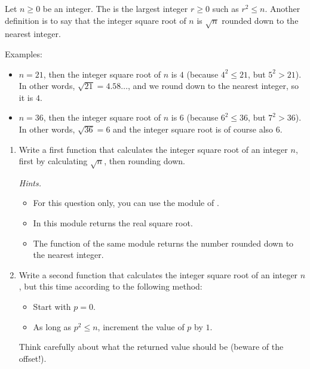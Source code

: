 \documentclass[11pt,class=report,crop=false]{standalone}
\begin{document}

\begin{activite}



Let $n \ge 0$ be an integer. 
The  is the largest integer $r\ge0$ such as $r^2 \le  n$. 
Another definition is to say that the integer square root of $n$ is $\sqrt{n}$ rounded down to the nearest integer.

Examples:
\begin{itemize}
  \item $n=21$, then the integer square root of $n$ is $4$ (because $4^2 \le 21$, but $5^2 > 21$). In other words, $\sqrt{21} = 4.58\ldots$, and we round down to the nearest integer, so it is $4$.
  
  \item $n=36$, then the integer square root of $n$ is $6$ (because $6^2 \le 36$, but $7^2 > 36$). In other words, $\sqrt{36} = 6$ and the integer square root is of course also $6$.    
\end{itemize}

\begin{enumerate}
  \item Write a first function that calculates the integer square root of an integer $n$, first by calculating $\sqrt{n}$, then rounding down.
  
  \emph{Hints.}
  \begin{itemize}
    \item For this question only, you can use the  module of \Python. 
    \item In this module  returns the real square root.
    \item The function  of the same module returns the number rounded down to the nearest integer.
  \end{itemize}
  
  \item Write a second function that calculates the integer square root of an integer $n$, but this time according to the following method:
  \begin{itemize}
    \item Start with $p=0$.
    \item As long as $p^2 \le n$, increment the value of $p$ by $1$.
  \end{itemize}
  Think carefully about what the returned value should be (beware of the offset!).
  

\end{enumerate}
\end{activite}
\end{document}
